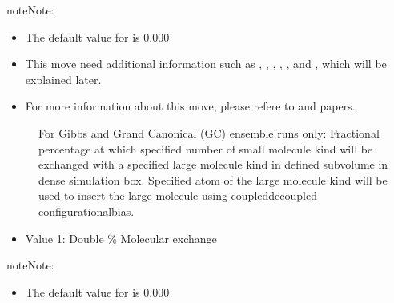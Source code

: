 \documentclass[letterpaper,10pt,english]{sphinxmanual}
\begin{document}
\begin{description}
\begin{itemize}
\end{itemize}

\begin{sphinxadmonition}{note}{Note:}\begin{itemize}
\item {} 
\sphinxAtStartPar
The default value for  is 0.000

\item {} 
\sphinxAtStartPar
This move need additional information such as , , , , , and , which will be explained later.

\item {} 
\sphinxAtStartPar
For more information about this move, please refere to  and  papers.

\end{itemize}
\end{sphinxadmonition}
\begin{description}
\item[{}] \leavevmode
\sphinxAtStartPar
For Gibbs and Grand Canonical (GC) ensemble runs only: Fractional percentage at which specified number of small molecule kind will be exchanged with a specified large molecule kind in defined sub\sphinxhyphen{}volume in dense simulation box. Specified atom of the large molecule kind will be used to insert the large molecule using coupled\sphinxhyphen{}decoupled configurational\sphinxhyphen{}bias.

\end{description}
\begin{itemize}
\item {} 
\sphinxAtStartPar
Value 1: Double \sphinxhyphen{} \% Molecular exchange

\end{itemize}

\begin{sphinxadmonition}{note}{Note:}\begin{itemize}
\item {} 
\sphinxAtStartPar
The default value for  is 0.000


\end{itemize}
\end{sphinxadmonition}
\end{description}
\end{document}
